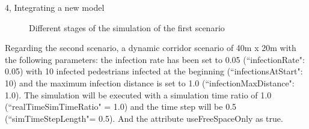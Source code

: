 \documentclass[10pt,a4paper]{article}
\begin{document}
\begin{task}{4, Integrating a new model}
\begin{figure} [H]
    \centering
        \caption{Different stages of the simulation of the first scenario}
        \label{task4}
\end{figure}

Regarding the second scenario, a dynamic corridor scenario of 40m x 20m with the following parameters: the infection rate has been set to 0.05 (``infectionRate": 0.05) with 10 infected pedestrians infected at the beginning (``infectionsAtStart": 10) and the maximum infection distance is set to 1.0 (``infectionMaxDistance": 1.0). The simulation will be executed with a simulation time ratio of 1.0 (``realTimeSimTimeRatio" = 1.0) and the time step will be 0.5 (``simTimeStepLength"= 0.5). And the attribute useFreeSpaceOnly as true.


\end{task}
\end{document}
